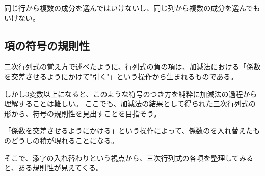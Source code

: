 \documentclass[../../../topic_linear-algebra]{subfiles}
\begin{document}
同じ行から複数の成分を選んではいけないし、同じ列から複数の成分を選んでもいけない。

\subsection{項の符号の規則性}

\hyperref[sec:det2x2-add-subtract]{二次行列式の覚え方}で述べたように、行列式の負の項は、加減法における「係数を交差させるようにかけて"引く"」という操作から生まれるものである。

\br

しかし3変数以上になると、このような符号のつき方を純粋に加減法の過程から理解することは難しい。
ここでも、加減法の結果として得られた三次行列式の形から、符号の規則性を見出すことを目指そう。

\br

「係数を交差させるようにかける」という操作によって、係数のを入れ替えたものどうしの積が現れることになる。

そこで、添字の入れ替わりという視点から、三次行列式の各項を整理してみると、ある規則性が見えてくる。
\end{document}
